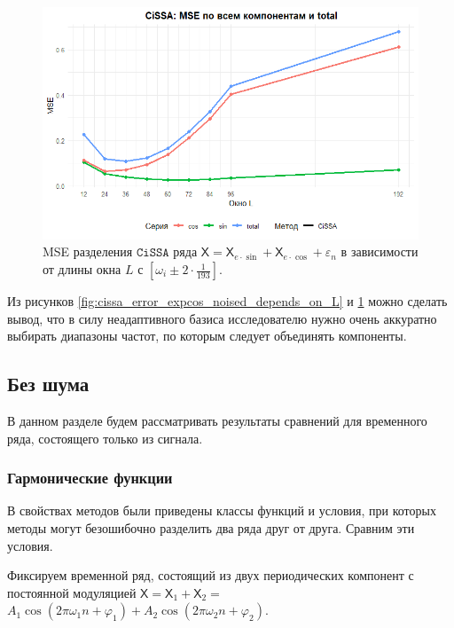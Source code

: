 \documentclass[12pt, specialist, subf
]{disser}
\theoremstyle{definition}
\newcommand{\CISSA}{\texttt{CiSSA}}
\newcommand{\TS}{\mathsf{X}}
\begin{document}
 \begin{figure}[H]
	\centering
	\includegraphics[width=1\textwidth]{img/cissa_errors_plot_expcos_noised_2.png}
	\caption{MSE разделения $\CISSA$ ряда $\TS = \TS_{e\cdot\sin} + \TS_{e\cdot\cos} + \varepsilon_n$ в зависимости от длины окна $L$ с $[\omega_i \pm 2 \cdot \frac{1}{193}]$.}
	\label{fig:cissa_error_expcos_noised_depends_on_L_2}
\end{figure}


Из рисунков \ref{fig:cissa_error_expcos_noised_depends_on_L} и \ref{fig:cissa_error_expcos_noised_depends_on_L_2} можно сделать вывод, что в силу неадаптивного базиса исследователю нужно очень аккуратно выбирать диапазоны частот, по которым следует объединять компоненты.


\subsection{Без шума}
\label{subsec:cissa_examples_without_noise}

В данном разделе будем рассматривать результаты сравнений для временного ряда, состоящего только из сигнала.



\subsubsection{Гармонические функции}
\label{subsubsec:exact}

В свойствах методов были приведены классы функций и условия, при которых методы могут безошибочно разделить два ряда друг от друга. Сравним эти условия.


Фиксируем временной ряд, состоящий из двух периодических компонент с постоянной модуляцией  $\TS = \TS_{1} + \TS_{2} =$ $A_1 \cos(2\pi \omega_1 n + \varphi_1) + A_2 \cos(2\pi \omega_2 n + \varphi_2)$.
\end{document}
